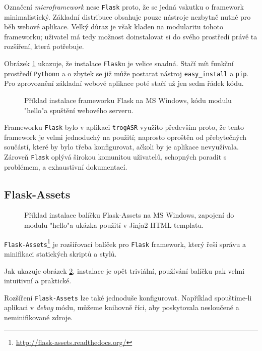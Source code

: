 Označení {\sl microframework} nese \verb|Flask| proto, že se jedná vskutku o framework minimalistický. Základní distribuce obsahuje pouze nástroje nezbytně nutné pro běh webové aplikace. Velký důraz je však kladen na modularitu tohoto frameworku; uživatel má tedy možnost doinstalovat si do svého prostředí právě ta rozšíření, která potřebuje.

Obrázek \ref{fig:flask_install} ukazuje, že instalace \verb|Flask|u je velice snadná. Stačí mít funkční prostředí \verb|Python|u a o zbytek se již může postarat nástroj \verb|easy_install| a \verb|pip|. Pro zprovoznění základní webové aplikace poté stačí už jen sedm řádek kódu.
\\
\begin{figure}[h]
	
	\caption{Příklad instalace frameworku Flask na MS Windows, kódu modulu "hello"\;a spuštění webového serveru.}
	\label{fig:flask_install}
\end{figure}

Frameworku \verb|Flask| bylo v aplikaci \verb|trogASR| využito především proto, že tento framework je velmi jednoduchý na použití; naprosto oproštěn od přebytečných součástí, které by bylo třeba konfigurovat, ačkoli by je aplikace nevyužívala. Zároveň \verb|Flask| oplývá širokou komunitou uživatelů, schopných poradit s problémem, a exhaustivní dokumentací.

\subsection{Flask-Assets}

\begin{figure}[h]
	
	\caption{Příklad instalace balíčku Flask-Assets na MS Windows, zapojení do modulu "hello"\;a ukázka použití v Jinja2 HTML templatu.}
	\label{fig:flask_a_install}
\end{figure}

\verb|Flask-Assets|\footnote{\url{http://flask-assets.readthedocs.org/}} je rozšiřovací balíček pro \verb|Flask| framework, který řeší správu a minifikaci statických skriptů a stylů.

Jak ukazuje obrázek \ref{fig:flask_a_install}, instalace je opět triviální, používání balíčku pak velmi intuitivní a praktické.

Rozšíření \verb|Flask-Assets| lze také jednoduše konfigurovat. Například spouštíme-li aplikaci v {\sl debug} módu, můžeme knihovně říci, aby poskytovala nesloučené a neminifikované zdroje.

